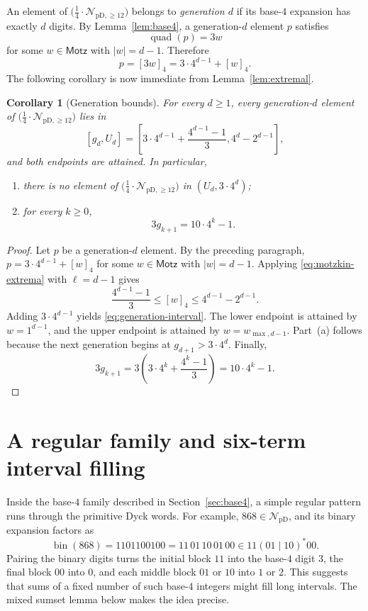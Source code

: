 \documentclass[12pt]{article}
\theoremstyle{plain}
\newtheorem{corollary}[theorem]{Corollary}
\theoremstyle{definition}
\theoremstyle{plain}
\newcommand{\NpD}{\mathcal{N}_{\mathrm{pD}}}
\newcommand{\Pset}{%
  \bigl(\tfrac{1}{4}\cdot\mathcal{N}_{\mathrm{pD},\geq 12}\bigr)%
}
\begin{document}
An element of $\Pset$ belongs to \emph{generation $d$} if its base-$4$
expansion has exactly $d$ digits.  By Lemma~\ref{lem:base4}, a
generation-$d$ element $p$ satisfies
\[
 \operatorname{quad}(p)=3w
\]
for some $w\in\mathsf{Motz}$ with $|w|=d-1$.  Therefore
\[
 p=[3w]_4=3\cdot4^{d-1}+[w]_4.
\]
The following corollary is now immediate from Lemma~\ref{lem:extremal}.

\begin{corollary}[Generation bounds]\label{cor:gen}
For every $d\geq1$, every generation-$d$ element of $\Pset$ lies in
\begin{equation}\label{eq:generation-interval}
  [g_d,U_d]
  =\left[
  3\cdot4^{d-1}+\frac{4^{d-1}-1}{3},
  4^d-2^{d-1}
  \right],
\end{equation}
and both endpoints are attained.  In particular,
\begin{enumerate}[label=\textup{(\alph*)}]
\item there is no element of $\Pset$ in $(U_d,3\cdot4^d)$;
\item for every $k\geq0$,
\begin{equation}\label{eq:three-g}
  3g_{k+1}=10\cdot4^k-1.
\end{equation}
\end{enumerate}
\end{corollary}

\begin{proof}
Let $p$ be a generation-$d$ element.  By the preceding paragraph,
$p=3\cdot4^{d-1}+[w]_4$ for some $w\in\mathsf{Motz}$ with
$|w|=d-1$.  Applying \eqref{eq:motzkin-extrema} with $\ell=d-1$ gives
\[
 \frac{4^{d-1}-1}{3}
 \leq[w]_4
 \leq4^{d-1}-2^{d-1}.
\]
Adding $3\cdot4^{d-1}$ yields \eqref{eq:generation-interval}.  The lower
endpoint is attained by $w=1^{d-1}$, and the upper endpoint is attained by
$w=w_{\max,d-1}$.  Part~(a) follows because the next generation begins at
$g_{d+1}>3\cdot4^d$.  Finally,
\[
  3g_{k+1}
  =3\left(3\cdot4^k+\frac{4^k-1}{3}\right)
  =10\cdot4^k-1.
\]
\end{proof}

\section{A regular family and six-term interval filling}\label{sec:regular}

Inside the base-$4$ family described in Section~\ref{sec:base4}, a simple regular pattern runs through the primitive Dyck words.  For
example, $868\in\NpD$, and its binary expansion factors as
\[
 \operatorname{bin}(868)=1101100100=11\,01\,10\,01\,00
 \in 11(01\mid10)^*00 .
\]
Pairing the binary digits turns the initial block $11$ into the base-$4$
digit $3$, the final block $00$ into $0$, and each middle block $01$ or
$10$ into $1$ or $2$.  This suggests that sums of a fixed number of such
base-$4$ integers might fill long intervals.  The mixed sumset lemma
below makes the idea precise.
\end{document}
